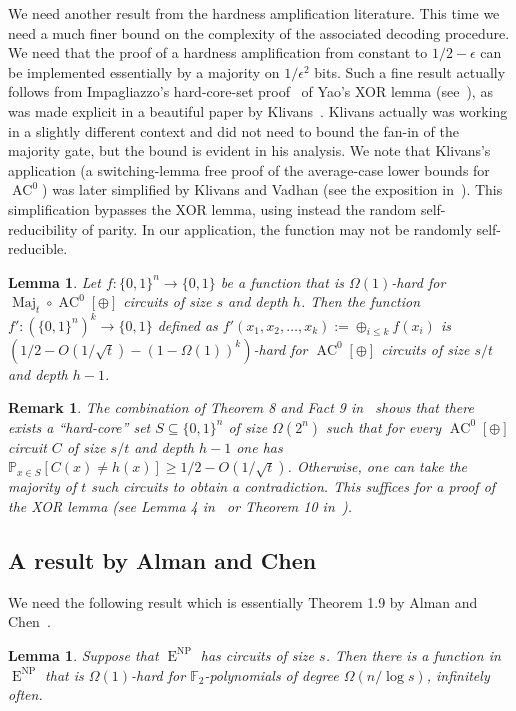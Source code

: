 \documentclass[11pt]{article}
\newtheorem{rem}[theorem]{Remark}   %
\newtheorem{lem}[theorem]{Lemma}  %
\DeclareMathOperator{\Maj}{\mathrm{Maj}}  %
\DeclareMathOperator{\AC}{\mathrm{AC}}  %
\DeclareMathOperator{\NP}{\mathrm{NP}}  %
\DeclareMathOperator{\EEE}{\mathrm{E}}  %
\newcommand{\zo}{\{0, 1\}}
\newcommand{\F}{\mathbb{F}}
\renewcommand{\P}{\mathbb{P}}
\newcommand{\e}{\epsilon}
\begin{document}
We need another result from the hardness amplification literature.
This time we need a much finer bound on the complexity of the associated
decoding procedure. We need that the proof of a hardness amplification
from constant to $1/2-\e$ can be implemented essentially by a majority
on $1/\e^{2}$ bits. Such a fine result actually follows from Impagliazzo's
hard-core-set proof~\cite{Imp95} of Yao's XOR lemma (see~\cite{GNW95}),
as was made explicit in a beautiful paper by Klivans~\cite{Kli01}.
Klivans actually was working in a slightly different context and did
not need to bound the fan-in of the majority gate, but the bound is
evident in his analysis. We note that %
Klivans's   %
application (a switching-lemma
free proof of the average-case lower bounds for $\AC^{0}$) was later
simplified by Klivans and Vadhan (see the exposition in~\cite{viola-FTTCS09}).
This simplification bypasses the XOR lemma, using instead the random
self-reducibility of parity. In our application, the function may
not be randomly self-reducible.
\begin{lem}
\label{lem:Klivans}Let $f:\zo^{n}\to\zo$ be a function that is $\Omega(1)$-hard
for $\Maj_{t}\circ \AC^{0}[\oplus]$ circuits of size $s$ and depth
$h$. Then the function $f':(\zo^{n})^{k}\to\zo$ defined as $f'(x_{1},x_{2},\ldots,x_{k}):=\oplus_{i\le k}f(x_{i})$
is $(1/2-O(1/\sqrt{t})-(1-\Omega(1))^{k})$-hard for $\AC^{0}[\oplus]$
circuits of size $s/t$ and depth $h-1$.
\end{lem}

\begin{rem}
The combination of Theorem 8 and Fact 9 in~\cite{Kli01} shows that
there exists a ``hard-core'' set $S\subseteq\zo^{n}$ of size $\Omega(2^{n})$
such that for every $\AC^{0}[\oplus]$ circuit $C$ of size $s/t$
and depth $h-1$ one has $\P_{x\in S}[C(x)\ne h(x)]\ge1/2-O(1/\sqrt{t})$.
Otherwise, one can take the majority of $t$ such circuits to obtain
a contradiction. This suffices for a proof of the XOR lemma (see Lemma
4 in~\cite{Imp95} or Theorem 10 in~\cite{Kli01}).
\end{rem}


\subsection{A result by Alman and Chen}

We need the following result which is essentially Theorem 1.9 by Alman
and Chen~\cite{AlmanC19}.
\begin{lem}
\label{lem:stronger-AlmanChen-Conditional-1} Suppose that $\EEE^{\NP}$
has circuits of size $s$. Then there is a function in $\EEE^{\NP}$ that
is $\Omega(1)$-hard for $\F_{2}$-polynomials of degree $\Omega(n/\log s)$,
infinitely often.
\end{lem}
\end{document}
